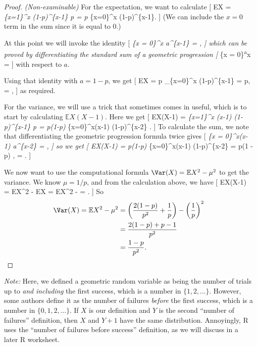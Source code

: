 \documentclass[
  letterpaper,
]{report}
\theoremstyle{definition}
\theoremstyle{definition}
\theoremstyle{remark}
\begin{document}
\begin{proof}

\emph{(Non-examinable)} For the expectation, we want to calculate {[}
\mathbb EX = \sum\emph{\{x=1\}\^{}\infty x (1-p)\^{}\{x-1\} p = p
\sum}\{x=0\}\^{}\infty x (1-p)\^{}\{x-1\}. {]} (We can include the
\(x = 0\) term in the sum since it is equal to 0.)

At this point we will invoke the identity {[} \sum\emph{\{x =
0\}\^{}\infty x a\^{}\{x-1\} =  , {]} which can be
proved by differentiating the standard sum of a geometric progression
{[} \sum}\{x = 0\}\textsuperscript{\infty a}x =  {]} with
respect to \(a\).

Using that identity with \(a = 1-p\), we get {[} \mathbb EX = p
\sum\_\{x=0\}\^{}\infty x (1-p)\^{}\{x-1\} = p,
 =  , {]} as required.

For the variance, we will use a trick that sometimes comes in useful,
which is to start by calculating \(\mathbb EX(X-1)\). Here we get {[}
\mathbb EX(X-1) = \sum\emph{\{x=1\}\^{}\infty x (x-1) (1-p)\^{}\{x-1\} p
= p(1-p) \sum}\{x=0\}\^{}\infty x(x-1) (1-p)\^{}\{x-2\} . {]} To
calculate the sum, we note that differentiating the geometric
progression formula twice gives {[} \sum\emph{\{x = 0\}\^{}\infty x(x-1)
a\^{}\{x-2\} =  , {]} so we get {[} \mathbb EX(X-1) =
p(1-p) \sum}\{x=0\}\^{}\infty x(x-1) (1-p)\^{}\{x-2\} = p(1 -p) ,
 =  . {]}

We now want to use the computational formula
\(\Var(X) = \mathbb EX^2 - \mu^2\) to get the variance. We know
\(\mu = 1/p\), and from the calculation above, we have {[}
\mathbb EX(X-1) = \mathbb EX\^{}2 - \mathbb EX = \mathbb EX\^{}2 -
 =  . {]} So \begin{align*}
\Var(X) = \mathbb EX^2 - \mu^2
&= \left(\frac{2(1-p)}{p^2} + \frac{1}{p}\right) - \left(\frac{1}{p}\right)^2 \\
&= \frac{2(1-p) + p - 1}{p^2} \\
&= \frac{1-p}{p^2} .
\end{align*}

\end{proof}

\emph{Note:} Here, we defined a geometric random variable as being the
number of trials up to \emph{and including} the first success, which is
a number in \(\{1, 2, \dots\}\). However, some authors define it as the
number of failures \emph{before} the first success, which is a number in
\(\{0, 1, 2,\dots\}\). If \(X\) is our definition and \(Y\) is the
second ``number of failures'' definition, then \(X\) and \(Y+1\) have
the same distribution. Annoyingly, R uses the ``number of failures
before success'' definition, as we will discuss in a later R worksheet.
\end{document}
